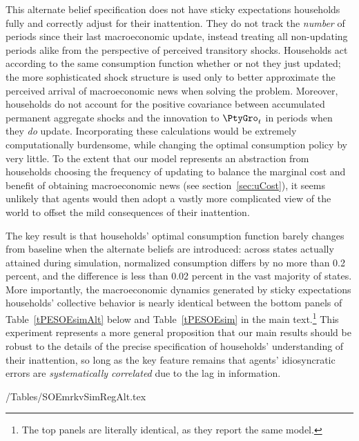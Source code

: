 This alternate belief specification does not have sticky expectations households fully and correctly adjust for their inattention.  They do not track the \textit{number} of periods since their last macroeconomic update, instead treating all non-updating periods alike from the perspective of perceived transitory shocks. Households act according to the same consumption function whether or not they just updated; the more sophisticated shock structure is used only to better approximate the perceived arrival of macroeconomic news when solving the problem.  Moreover, households do not account for the positive covariance between accumulated permanent aggregate shocks and the innovation to $\PtyGro_t$ in periods when they \textit{do} update.  Incorporating these calculations would be extremely computationally burdensome, while changing the optimal consumption policy by very little.  To the extent that our model represents an abstraction from households choosing the frequency of updating to balance the marginal cost and benefit of obtaining macroeconomic news (see section~\ref{sec:uCost}), it seems unlikely that agents would then adopt a vastly more complicated view of the world to offset the mild consequences of their inattention.

The key result is that households' optimal consumption function barely changes from baseline when the alternate beliefs are introduced: across states actually attained during simulation, normalized consumption differs by no more than 0.2 percent, and the difference is less than 0.02 percent in the vast majority of states.  More importantly, the macroeconomic dynamics generated by sticky expectations households' collective behavior is nearly identical between the bottom panels of Table~\ref{tPESOEsimAlt} below and Table~\ref{tPESOEsim} in the main text.\footnote{The top panels are literally identical, as they report the same model.}  This experiment represents a more general proposition that our main results should be robust to the details of the precise specification of households' understanding of their inattention, so long as the key feature remains that agents' idiosyncratic errors are \textit{systematically correlated} due to the lag in information.


\econtexRoot/Tables/SOEmrkvSimRegAlt.tex
